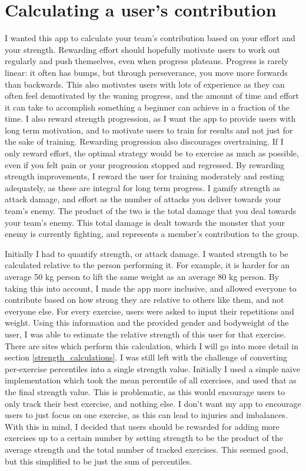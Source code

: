 \documentclass{l4proj}
\begin{document}
\section{Calculating a user's contribution}
I wanted this app to calculate your team's contribution based on your effort and your strength. Rewarding effort should hopefully motivate users to work out regularly and push themselves, even when progress plateaus. Progress is rarely linear: it often has bumps, but through perseverance, you move more forwards than backwards. This also motivates users with lots of experience as they can often feel demotivated by the waning progress, and the amount of time and effort it can take to accomplish something a beginner can achieve in a fraction of the time. I also reward strength progression, as I want the app to provide users with long term motivation, and to motivate users to train for results and not just for the sake of training. Rewarding progression also discourages overtraining. If I only reward effort, the optimal strategy would be to exercise as much as possible, even if you felt pain or your progression stopped and regressed. By rewarding strength improvements, I reward the user for training moderately and resting adequately, as these are integral for long term progress. I gamify strength as attack damage, and effort as the number of attacks you deliver towards your team's enemy. The product of the two is the total damage that you deal towards your team's enemy. This total damage is dealt towards the monster that your enemy is currently fighting, and represents a member's contribution to the group.

Initially I had to quantify strength, or attack damage. I wanted strength to be calculated relative to the person performing it. For example, it is harder for an average 50 kg person to lift the same weight as an average 80 kg person. By taking this into account, I made the app more inclusive, and allowed everyone to contribute based on how strong they are relative to others like them, and not everyone else. For every exercise, users were asked to input their repetitions and weight. Using this information and the provided gender and bodyweight of the user, I was able to estimate the relative strength of this user for that exercise. There are sites which perform this calculation, which I will go into more detail in section \ref{strength_calculations}. I was still left with the challenge of converting per-exercise percentiles into a single strength value. Initially I used a simple naive implementation which took the mean percentile of all exercises, and used that as the final strength value. This is problematic, as this would encourage users to only track their best exercise, and nothing else. I don't want my app to encourage users to just focus on one exercise, as this can lead to injuries and imbalances. With this in mind, I decided that users should be rewarded for adding more exercises up to a certain number by setting strength to be the product of the average strength and the total number of tracked exercises. This seemed good, but this simplified to be just the sum of percentiles.
\end{document}
